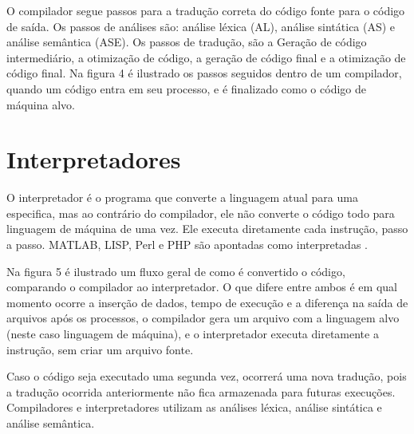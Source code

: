 \documentclass[12pt,oneside,a4paper,chapter=TITLE,section=TITLE,sumario=tradicional]{abntex2}
\begin{document}
\begin{figure}[htb]
\end{figure}

O compilador segue passos para a tradução correta do código fonte para o código de saída. Os passos de análises são: análise léxica (AL), análise sintática (AS) e análise semântica (ASE). Os passos de tradução, são a Geração de código intermediário, a otimização de código, a geração de código final e a otimização de código final. Na figura 4 é ilustrado os passos seguidos dentro de um compilador, quando um código entra em seu processo, e é finalizado como o código de máquina alvo.

\begin{figure}[htb]
\end{figure}


\section{Interpretadores}
\label{sec:interpretadores}

O interpretador é o programa que converte a linguagem atual para uma especifica, mas ao contrário do compilador, ele não converte o código todo para linguagem de máquina de uma vez. Ele executa diretamente cada instrução, passo a passo. MATLAB, LISP, Perl e PHP são apontadas como interpretadas \cite{penelope2019}.

Na figura 5 é ilustrado um fluxo geral de como é convertido o código, comparando o compilador ao interpretador. O que difere entre ambos é em qual momento ocorre a inserção de dados, tempo de execução e a diferença na saída de arquivos após os processos, o compilador gera um arquivo com a linguagem alvo (neste caso linguagem de máquina), e o interpretador executa diretamente a instrução, sem criar um arquivo fonte.

\begin{figure}[htb]
\end{figure}

Caso o código seja executado uma segunda vez, ocorrerá uma nova tradução, pois a tradução ocorrida anteriormente não fica armazenada para futuras execuções. Compiladores e interpretadores utilizam as análises léxica, análise sintática e análise semântica.
\end{document}
